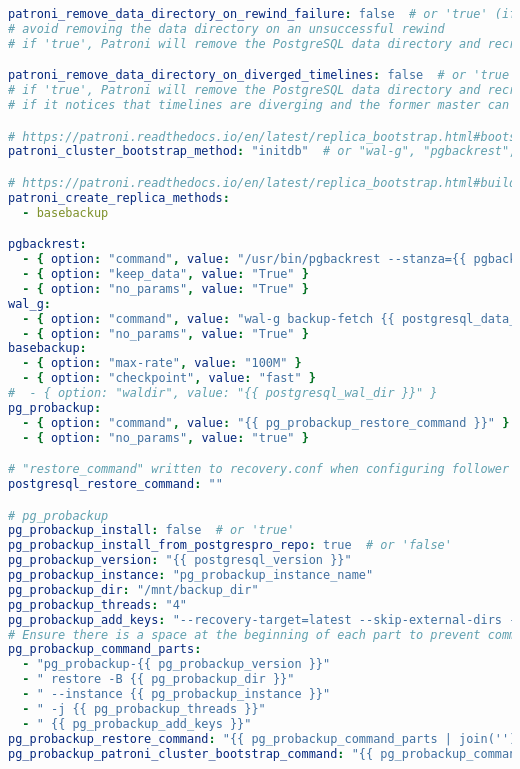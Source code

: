 \begin{flushleft}
\begin{lstlisting}[language=yaml, caption=Testsystem - Deployment - main.yml,captionpos=b,label={lst:testsystem-deployment-main.yml},breaklines=true]
patroni_remove_data_directory_on_rewind_failure: false  # or 'true' (if use_pg_rewind: 'true')
# avoid removing the data directory on an unsuccessful rewind
# if 'true', Patroni will remove the PostgreSQL data directory and recreate the replica.

patroni_remove_data_directory_on_diverged_timelines: false  # or 'true'
# if 'true', Patroni will remove the PostgreSQL data directory and recreate the replica
# if it notices that timelines are diverging and the former master can not start streaming from the new master.

# https://patroni.readthedocs.io/en/latest/replica_bootstrap.html#bootstrap
patroni_cluster_bootstrap_method: "initdb"  # or "wal-g", "pgbackrest", "pg_probackup"

# https://patroni.readthedocs.io/en/latest/replica_bootstrap.html#building-replicas
patroni_create_replica_methods:
  - basebackup

pgbackrest:
  - { option: "command", value: "/usr/bin/pgbackrest --stanza={{ pgbackrest_stanza }} --delta restore" }
  - { option: "keep_data", value: "True" }
  - { option: "no_params", value: "True" }
wal_g:
  - { option: "command", value: "wal-g backup-fetch {{ postgresql_data_dir }} LATEST" }
  - { option: "no_params", value: "True" }
basebackup:
  - { option: "max-rate", value: "100M" }
  - { option: "checkpoint", value: "fast" }
#  - { option: "waldir", value: "{{ postgresql_wal_dir }}" }
pg_probackup:
  - { option: "command", value: "{{ pg_probackup_restore_command }}" }
  - { option: "no_params", value: "true" }

# "restore_command" written to recovery.conf when configuring follower (create replica)
postgresql_restore_command: ""

# pg_probackup
pg_probackup_install: false  # or 'true'
pg_probackup_install_from_postgrespro_repo: true  # or 'false'
pg_probackup_version: "{{ postgresql_version }}"
pg_probackup_instance: "pg_probackup_instance_name"
pg_probackup_dir: "/mnt/backup_dir"
pg_probackup_threads: "4"
pg_probackup_add_keys: "--recovery-target=latest --skip-external-dirs --no-validate"
# Ensure there is a space at the beginning of each part to prevent commands from concatenating.
pg_probackup_command_parts:
  - "pg_probackup-{{ pg_probackup_version }}"
  - " restore -B {{ pg_probackup_dir }}"
  - " --instance {{ pg_probackup_instance }}"
  - " -j {{ pg_probackup_threads }}"
  - " {{ pg_probackup_add_keys }}"
pg_probackup_restore_command: "{{ pg_probackup_command_parts | join('') }}"
pg_probackup_patroni_cluster_bootstrap_command: "{{ pg_probackup_command_parts | join('') }}"


\end{lstlisting}
\end{flushleft}
